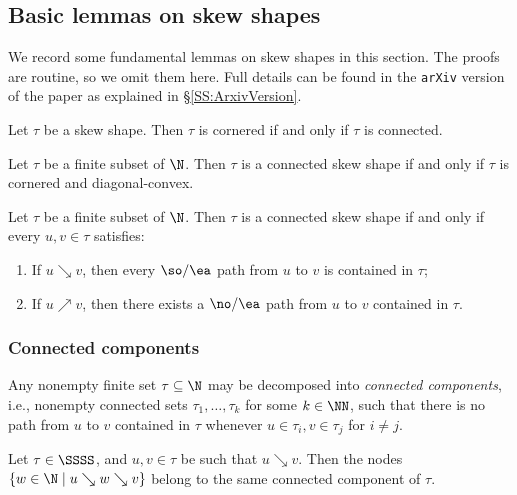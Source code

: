 \subsection{Basic lemmas on skew shapes}
We record some fundamental lemmas on skew shapes in this section. The proofs are routine, so we omit them here. Full details can be found in the \texttt{arXiv} version of the paper as explained in \S\ref{SS:ArxivVersion}. 

\begin{lemma}\label{skew:cornered=connected}
Let \(\tau\) be a skew shape. Then \(\tau\) is cornered if and only if \(\tau\) is connected.
\end{lemma}


\begin{lemma}\label{CSS=PDC}
Let \(\tau\) be a finite subset of \(\N\). Then \(\tau\) is a connected skew shape if and only if \(\tau\) is cornered and diagonal-convex.
\end{lemma}


\begin{lemma}\label{pathcrit}
Let \(\tau\) be a finite subset of \(\N\). Then \(\tau\) is a connected skew shape if and only if every \(u,v \in \tau\) satisfies:
\begin{enumerate}
\item If \(u \searrow v\), then every \(\so/\ea\) path from \(u\) to \(v\) is contained in \(\tau\);
\item If \(u \nearrow v\), then there exists a \(\no/\ea\) path from \(u\) to \(v\) contained in \(\tau\).
\end{enumerate}
\end{lemma}


\subsubsection{Connected components}
Any nonempty finite set \(\tau \subseteq \N\) may be decomposed into {\em connected components}, i.e., nonempty connected sets \(\tau_1, \ldots, \tau_k\) for some \(k \in \NN\), such that there is no path from \(u\) to \(v\) contained in \(\tau\) whenever \(u \in \tau_i, v \in \tau_j\) for \(i \neq j\).

\begin{lemma}\label{seconnect}
Let \(\tau \in \SSSS\), and \(u,v \in \tau\) be such that \(u \searrow v\). Then the nodes \(\{w \in \N \mid u \searrow w \searrow v\}\) belong to the same connected component of \(\tau\).
\end{lemma}


